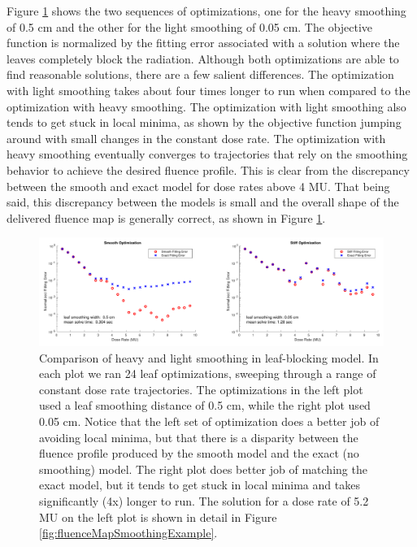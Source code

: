 \documentclass[12pt]{article}
\begin{document}
Figure \ref{fig:smoothVsStiffOptimization} shows the two sequences of optimizations, one for the
heavy smoothing of 0.5 cm and the other for the light smoothing of 0.05 cm.
The objective function is normalized by the fitting error associated with a solution where the
leaves completely block the radiation.
Although both optimizations are able to find reasonable solutions, there are a few salient differences.
The optimization with light smoothing takes about four times longer to run when
compared to the optimization with heavy smoothing.
The optimization with light smoothing also tends to get stuck in local minima, as shown by the
objective function jumping around with small changes in the constant dose rate.
The optimization with heavy smoothing eventually converges to trajectories that rely on the
smoothing behavior to achieve the desired fluence profile. This is clear from the discrepancy
between the smooth and exact model for dose rates above 4 MU.
That being said, this discrepancy between the models is small and the overall shape of the delivered
fluence map is generally correct, as shown in Figure \ref{fig:smoothVsStiffOptimization}.

\begin{figure}
  \centering
  \includegraphics[width=\textwidth]{fig/smoothVsStiffOptimization.pdf}
  \caption{Comparison of heavy and light smoothing in leaf-blocking model.
           In each plot we ran 24 leaf optimizations, sweeping through a range of constant dose rate trajectories.
           The optimizations in the left plot used a leaf smoothing distance of 0.5 cm, while the
           right plot used 0.05 cm.
           Notice that the left set of optimization does a better job of avoiding local minima,
           but that there is a disparity between the fluence profile produced by the smooth model
           and the exact (no smoothing) model.
           The right plot does better job of matching the exact model, but it tends to get stuck in local minima
           and takes significantly (4x) longer to run.
           The solution for a dose rate of 5.2 MU on the left plot is
           shown in detail in Figure \ref{fig:fluenceMapSmoothingExample}.
          }
  \label{fig:smoothVsStiffOptimization}
\end{figure}
\end{document}
